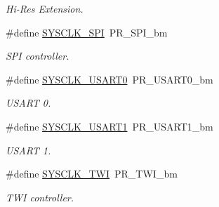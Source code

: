 \begin{DoxyCompactItemize}
\begin{DoxyCompactList}\small\item\em Hi-\/\-Res Extension. \end{DoxyCompactList}\item 
\hypertarget{group__sysclk__group_ga4941f8bf9c260e3d982e281fd463fe26}{\#define \hyperlink{group__sysclk__group_ga4941f8bf9c260e3d982e281fd463fe26}{S\-Y\-S\-C\-L\-K\-\_\-\-S\-P\-I}~P\-R\-\_\-\-S\-P\-I\-\_\-bm}\label{group__sysclk__group_ga4941f8bf9c260e3d982e281fd463fe26}

\begin{DoxyCompactList}\small\item\em S\-P\-I controller. \end{DoxyCompactList}\item 
\hypertarget{group__sysclk__group_gaeeea970aa1d68f0726f6ac7b19882491}{\#define \hyperlink{group__sysclk__group_gaeeea970aa1d68f0726f6ac7b19882491}{S\-Y\-S\-C\-L\-K\-\_\-\-U\-S\-A\-R\-T0}~P\-R\-\_\-\-U\-S\-A\-R\-T0\-\_\-bm}\label{group__sysclk__group_gaeeea970aa1d68f0726f6ac7b19882491}

\begin{DoxyCompactList}\small\item\em U\-S\-A\-R\-T 0. \end{DoxyCompactList}\item 
\hypertarget{group__sysclk__group_ga1acb0cc02d975a6d9d4e92e56a2438a0}{\#define \hyperlink{group__sysclk__group_ga1acb0cc02d975a6d9d4e92e56a2438a0}{S\-Y\-S\-C\-L\-K\-\_\-\-U\-S\-A\-R\-T1}~P\-R\-\_\-\-U\-S\-A\-R\-T1\-\_\-bm}\label{group__sysclk__group_ga1acb0cc02d975a6d9d4e92e56a2438a0}

\begin{DoxyCompactList}\small\item\em U\-S\-A\-R\-T 1. \end{DoxyCompactList}\item 
\hypertarget{group__sysclk__group_gae6761c065555d454a6e104909f151289}{\#define \hyperlink{group__sysclk__group_gae6761c065555d454a6e104909f151289}{S\-Y\-S\-C\-L\-K\-\_\-\-T\-W\-I}~P\-R\-\_\-\-T\-W\-I\-\_\-bm}\label{group__sysclk__group_gae6761c065555d454a6e104909f151289}

\begin{DoxyCompactList}\small\item\em T\-W\-I controller. \end{DoxyCompactList}\end{DoxyCompactItemize}
